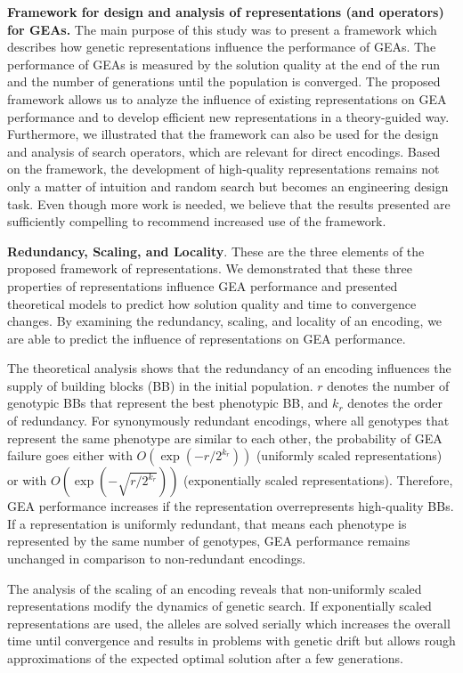 {\bfseries Framework for design and analysis of representations (and operators) for GEAs.} The main purpose of this study was to present a  framework which describes how genetic representations influence the performance of GEAs. The performance of GEAs is measured by the solution quality at the end of the run and the number of generations until the population is converged. 
The proposed framework allows us to analyze the influence of existing representations on GEA performance and to develop efficient new representations in a theory-guided way.
Furthermore, we illustrated that the framework can also be used for the design and analysis of search operators, which are relevant for direct encodings.
Based on the framework, the development of high-quality representations remains not only a matter of intuition and random search but becomes an engineering design task.
Even though more work is needed, we believe that the results presented are sufficiently compelling to recommend increased use of the framework.



{\bfseries Redundancy, Scaling, and Locality}. These are the three elements of the proposed framework of representations.  We demonstrated that these three properties of representations influence GEA performance and presented theoretical models to predict how solution quality and time to convergence changes.
By examining the redundancy, scaling, and locality of an encoding, we are able to predict the influence of representations on GEA performance.

The theoretical analysis shows that the redundancy of an encoding influences the supply of building blocks (BB) in the initial population. $r$ denotes the number of genotypic BBs that represent the best phenotypic BB, and $k_r$ denotes the order of redundancy. For synonymously redundant encodings, where all genotypes that represent the same phenotype are similar to each other, the probability of GEA failure goes either with  $O(\exp(-r/2^{k_r}))$ (uniformly scaled representations) or  with $O(\exp(-\sqrt{r/2^{k_r}}))$ (exponentially scaled representations).
Therefore, GEA performance increases if the representation overrepresents high-quality BBs. If a representation is uniformly redundant, that means each phenotype is represented by the same number of genotypes, GEA performance remains unchanged in comparison to non-redundant encodings.

The analysis of the scaling of an encoding reveals that non-uniformly scaled representations modify the dynamics of genetic search. If exponentially scaled representations are used, the alleles are solved serially which increases the overall time until convergence and results in problems with genetic drift but allows rough approximations of the expected optimal solution after a few generations.

